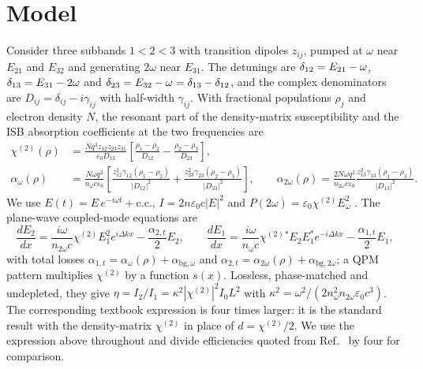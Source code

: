 \documentclass[11pt]{article}
\newcommand{\chitwo}{\chi^{(2)}}
\newcommand{\aw}{\alpha_{\omega}}
\newcommand{\aww}{\alpha_{2\omega}}
\let\hbar\relax\DeclareRobustCommand{\hbar}{{\mathchar'26\mkern-9mu h}}
\begin{document}
\section{Model}\label{sec:model}
Consider three subbands $1<2<3$ with transition dipoles $z_{ij}$, pumped at $\omega$ near $E_{21}$ and $E_{32}$ and generating $2\omega$ near $E_{31}$. The detunings are $\delta_{12}=E_{21}-\hbar\omega$, $\delta_{13}=E_{31}-2\hbar\omega$ and $\delta_{23}=E_{32}-\hbar\omega=\delta_{13}-\delta_{12}$, and the complex denominators are $D_{ij}=\delta_{ij}-i\gamma_{ij}$ with half-width $\gamma_{ij}$. With fractional populations $\rho_j$ and electron density $N$, the resonant part of the density-matrix susceptibility \cite{Boyd2008,Rosencher1991} and the ISB absorption coefficients at the two frequencies are
\begin{align}
\chitwo(\rho)&=\frac{Nq^3z_{12}z_{23}z_{31}}{\varepsilon_0D_{13}}\left[\frac{\rho_1-\rho_2}{D_{12}}-\frac{\rho_2-\rho_3}{D_{23}}\right],\label{eq:chi}\\
\aw(\rho)&=\frac{N\omega q^2}{n_\omega c\varepsilon_0}\left[\frac{z_{12}^2\gamma_{12}(\rho_1-\rho_2)}{|D_{12}|^2}+\frac{z_{23}^2\gamma_{23}(\rho_2-\rho_3)}{|D_{23}|^2}\right],\qquad
\aww(\rho)=\frac{2N\omega q^2}{n_{2\omega}c\varepsilon_0}\frac{z_{13}^2\gamma_{13}(\rho_1-\rho_3)}{|D_{13}|^2}.\label{eq:alpha}
\end{align}
We use $E(t)=E\,e^{-i\omega t}+\mathrm{c.c.}$, $I=2n\varepsilon_0c|E|^2$ and $P(2\omega)=\varepsilon_0\chitwo E_\omega^2$ \cite{Boyd2008}. The plane-wave coupled-mode equations are
\begin{equation}
\frac{dE_2}{dx}=\frac{i\omega}{n_{2\omega}c}\chitwo E_1^2e^{i\Delta kx}-\frac{\alpha_{2,t}}{2}E_2,\qquad
\frac{dE_1}{dx}=\frac{i\omega}{n_\omega c}\chitwo{}^{*}E_2E_1^{*}e^{-i\Delta kx}-\frac{\alpha_{1,t}}{2}E_1,\label{eq:cm}
\end{equation}
with total losses $\alpha_{1,t}=\aw(\rho)+\alpha_{\mathrm{bg},\omega}$ and $\alpha_{2,t}=\aww(\rho)+\alpha_{\mathrm{bg},2\omega}$; a QPM pattern multiplies $\chitwo$ by a function $s(x)$. Lossless, phase-matched and undepleted, they give $\eta=I_2/I_1=\kappa^2|\chitwo|^2I_0L^2$ with $\kappa^2=\omega^2/(2n_\omega^2n_{2\omega}\varepsilon_0c^3)$. The corresponding textbook expression \cite{Vurgaftman2021} is four times larger: it is the standard result with the density-matrix $\chitwo$ in place of $d=\chitwo/2$. We use the expression above throughout and divide efficiencies quoted from Ref.~\cite{Vurgaftman2021} by four for comparison.
\end{document}
